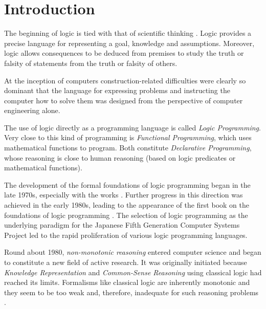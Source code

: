 \documentclass{tlp}
\begin{document}

\section{Introduction}
\label{introduction}

The beginning of logic is tied with that of scientific thinking
\cite{Art}. Logic provides a precise language for representing a goal,
knowledge and assumptions. Moreover, logic allows consequences to be deduced
from premises to study the truth or falsity of statements from the truth or
falsity of others.

At the inception of computers construction-related difficulties were
clearly so dominant that the language for expressing problems and
instructing the computer how to solve them was designed from the
perspective of computer engineering alone.

The use of logic directly as a programming language is called
\emph{Logic Programming}. Very close to this kind of programming is
\emph{Functional Programming}, which uses mathematical functions to
program. Both constitute \emph{Declarative Programming}, whose
reasoning is close to human reasoning (based on logic predicates or
mathematical functions).

The development of the formal foundations of logic programming began in the
late 1970s, especially with the works \cite{Emden,Clark,Reiter}. Further
progress in this direction was achieved in the early 1980s, leading to the
appearance of the first book on the foundations of logic programming
\cite{Lloyd}. The selection of logic programming as the underlying paradigm
for the Japanese Fifth Generation Computer Systems Project led to the rapid
proliferation of various logic programming languages.

Round about 1980, \emph{non-monotonic reasoning} entered computer
science and began to constitute a new field of active research. It was
originally initiated because \emph{Knowledge Representation} and
\emph{Common-Sense Reasoning} using classical logic had reached its
limits. Formalisms like classical logic are inherently monotonic and
they seem to be too weak and, therefore, inadequate for such reasoning
problems \cite{Dix97}.
\end{document}
